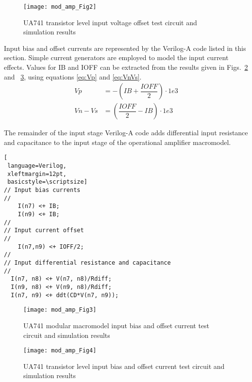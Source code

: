 \begin{figure} [h]
  \centering
  \texttt{[image: mod\_amp\_Fig2]} 
  \caption{UA741 transistor level input voltage offset test circuit and simulation results}
  \label{fig:mod_amp2}
\end{figure} 





Input bias and offset currents are represented by the Verilog-A code
listed in this section. Simple current generators are employed to
model the input current effects. Values for IB and IOFF can be
extracted from the results given in Figs.~\ref{fig:mod_amp3} and
~\ref{fig:mod_amp4}, using equations \eqref{eq:Vp} and
\eqref{eq:VnVs}.
\begin{align}
\label{eq:Vp}
Vp&=-\left(IB+\dfrac{IOFF}{2}\right)\cdot 1e3\\
\label{eq:VnVs}
Vn-Vs &= \left(\dfrac{IOFF}{2}-IB\right)\cdot 1e3
\end{align}

 The remainder of the input stage Verilog-A code adds differential
 input resistance and capacitance to the input stage of the
 operational amplifier macromodel.

\begin{lstlisting}[
 language=Verilog, 
 xleftmargin=12pt,
 basicstyle=\scriptsize]
// Input bias currents
//
    I(n7) <+ IB;
    I(n9) <+ IB;
//
// Input current offset
//
    I(n7,n9) <+ IOFF/2;
//
// Input differential resistance and capacitance
//
  I(n7, n8) <+ V(n7, n8)/Rdiff;
  I(n9, n8) <+ V(n9, n8)/Rdiff;
  I(n7, n9) <+ ddt(CD*V(n7, n9));
\end{lstlisting}

\begin{figure} [h]
  \centering
  \texttt{[image: mod\_amp\_Fig3]}
  \caption{UA741 modular macromodel input bias and offset current test circuit and simulation results}
  \label{fig:mod_amp3}
\end{figure} 

\begin{figure} [h]
  \centering
  \texttt{[image: mod\_amp\_Fig4]}
  \caption{UA741 transistor level input bias and offset current test circuit and simulation results}
  \label{fig:mod_amp4}
\end{figure} 



